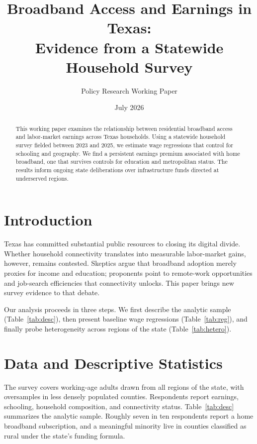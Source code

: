 \documentclass[11pt]{article}
\title{Broadband Access and Earnings in Texas:\\Evidence from a Statewide Household Survey}
\author{Policy Research Working Paper}
\date{July 2026}
\begin{document}
\maketitle

\begin{abstract}
\noindent This working paper examines the relationship between residential broadband access and labor-market earnings across Texas households. Using a statewide household survey fielded between 2023 and 2025, we estimate wage regressions that control for schooling and geography. We find a persistent earnings premium associated with home broadband, one that survives controls for education and metropolitan status. The results inform ongoing state deliberations over infrastructure funds directed at underserved regions.
\end{abstract}

\section{Introduction}

Texas has committed substantial public resources to closing its digital divide. Whether household connectivity translates into measurable labor-market gains, however, remains contested. Skeptics argue that broadband adoption merely proxies for income and education; proponents point to remote-work opportunities and job-search efficiencies that connectivity unlocks. This paper brings new survey evidence to that debate.

Our analysis proceeds in three steps. We first describe the analytic sample (Table~\ref{tab:desc}), then present baseline wage regressions (Table~\ref{tab:reg}), and finally probe heterogeneity across regions of the state (Table~\ref{tab:hetero}).

\section{Data and Descriptive Statistics}

The survey covers working-age adults drawn from all regions of the state, with oversamples in less densely populated counties. Respondents report earnings, schooling, household composition, and connectivity status. Table~\ref{tab:desc} summarizes the analytic sample. Roughly seven in ten respondents report a home broadband subscription, and a meaningful minority live in counties classified as rural under the state's funding formula.

\begin{table}[htbp]
\centering
\caption{Descriptive statistics, analytic sample}
\label{tab:desc}

\end{table}
\end{document}
